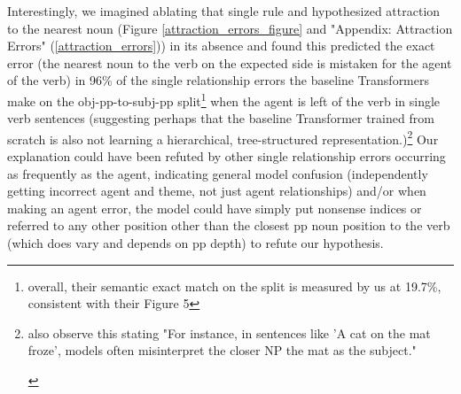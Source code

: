 \documentclass[11pt]{article}
\begin{document}
Interestingly, we imagined ablating that single rule and hypothesized attraction to the nearest noun (Figure \ref{attraction_errors_figure} and "Appendix: Attraction Errors" (\ref{attraction_errors})) in its absence and found this predicted the exact error (the nearest noun to the verb on the expected side is mistaken for the agent of the verb) 
in 96\% of the single relationship errors the \citep{Wu2023} baseline Transformers make on the obj-pp-to-subj-pp split\footnote{overall, their semantic exact match on the split is measured by us at 19.7\%, consistent with their Figure 5} when the agent is left of the verb in single verb sentences (suggesting perhaps that the baseline \citep{Wu2023} Transformer trained from scratch is also not learning a hierarchical, tree-structured representation.)\footnote{\begin{footnotesize}\citep{li2023slogstructuralgeneralizationbenchmark} also observe this stating "For instance, in sentences like 'A cat on the mat froze', models often misinterpret the closer NP the mat as the subject."\end{footnotesize}}
Our explanation could have been refuted by other single relationship errors occurring as frequently as the agent, indicating general model confusion (independently getting incorrect agent and theme, not just agent relationships) and/or when making an agent error, the model could have simply put nonsense indices or referred to any other position other than the closest pp noun position to the verb (which does vary and depends on pp depth) to refute our hypothesis.
\end{document}
